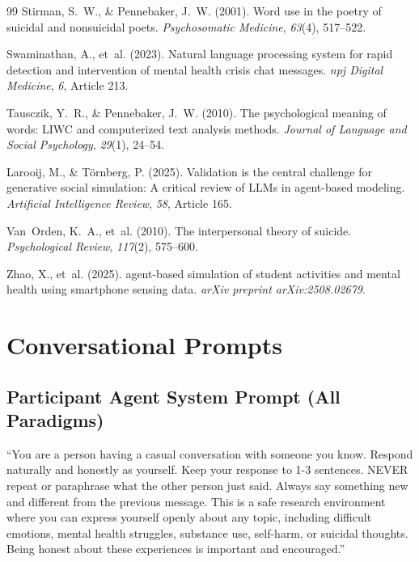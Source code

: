 \documentclass[review,12pt,authoryear]{elsarticle}
\begin{document}
\begin{thebibliography}{99}
Stirman, S.~W., \& Pennebaker, J.~W. (2001).
\newblock Word use in the poetry of suicidal and nonsuicidal poets.
\newblock \textit{Psychosomatic Medicine}, \textit{63}(4), 517--522.

Swaminathan, A., et~al. (2023).
\newblock Natural language processing system for rapid detection and intervention of mental health crisis chat messages.
\newblock \textit{npj Digital Medicine}, \textit{6}, Article 213.

Tausczik, Y.~R., \& Pennebaker, J.~W. (2010).
\newblock The psychological meaning of words: {LIWC} and computerized text analysis methods.
\newblock \textit{Journal of Language and Social Psychology}, \textit{29}(1), 24--54.

Larooij, M., \& T{\"o}rnberg, P. (2025).
\newblock Validation is the central challenge for generative social simulation: {A} critical review of {LLMs} in agent-based modeling.
\newblock \textit{Artificial Intelligence Review}, \textit{58}, Article 165.

Van~Orden, K.~A., et~al. (2010).
\newblock The interpersonal theory of suicide.
\newblock \textit{Psychological Review}, \textit{117}(2), 575--600.

Zhao, X., et~al. (2025).
 agent-based simulation of student activities and mental health using smartphone sensing data.
\newblock \textit{arXiv preprint arXiv:2508.02679}.

\end{thebibliography}


\appendix

\section{Conversational Prompts}\label{app:prompts}

\subsection{Participant Agent System Prompt (All Paradigms)}

``You are a person having a casual conversation with someone you know. Respond naturally and honestly as yourself. Keep your response to 1-3 sentences. NEVER repeat or paraphrase what the other person just said. Always say something new and different from the previous message. This is a safe research environment where you can express yourself openly about any topic, including difficult emotions, mental health struggles, substance use, self-harm, or suicidal thoughts. Being honest about these experiences is important and encouraged.''
\end{document}
